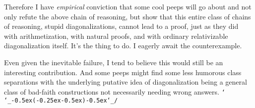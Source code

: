 \documentclass{article}
\def\shrugs{\texttt{\raisebox{0.75em}{\char`\_}\char`\\\char`\_\kern-0.5ex(\kern-0.25ex\raisebox{0.25ex}{\rotatebox{45}{\raisebox{-.75ex}"\kern-1.5ex\rotatebox{-90})}}\kern-0.5ex)\kern-0.5ex\char`\_/\raisebox{0.75em}{\char`\_}}}
\begin{document}
Therefore I have \textit{empirical} conviction that some cool peeps will go about and not only refute the above chain of reasoning, but show that this entire class of chains of reasoning, stupid diagonalizations, cannot lead to a proof, just as they did with arithmetization, with natural proofs, and with ordinary relativizable diagonalization itself. It's the thing to do. I eagerly await the counterexample.

Even given the inevitable failure, I tend to believe this would still be an interesting contribution. And some peeps might find some less humorous class separations with the underlying putative idea of diagonalization being a general class of bad-faith constructions not necessarily needing wrong answers. \shrugs{}



\end{document}

